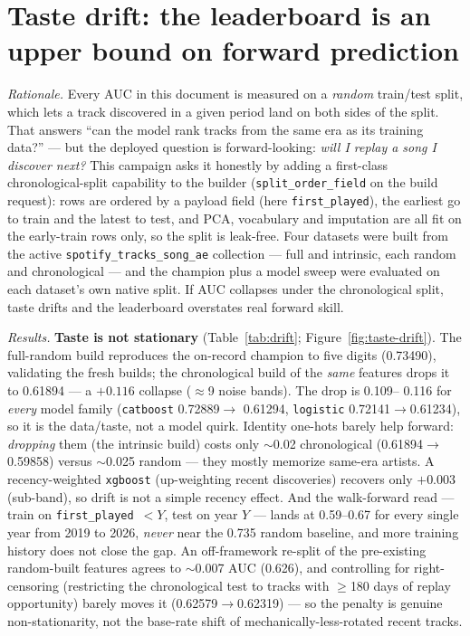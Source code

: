 \documentclass[11pt]{article}
\begin{document}
\section{Taste drift: the leaderboard is an upper bound on forward prediction}
\label{sec:drift}
\emph{Rationale.} Every AUC in this document is measured on a \emph{random}
train/test split, which lets a track discovered in a given period land on both
sides of the split. That answers ``can the model rank tracks from the same era
as its training data?'' --- but the deployed question is forward-looking:
\emph{will I replay a song I discover next?} This campaign asks it honestly by
adding a first-class chronological-split capability to the builder
(\texttt{split\_order\_field} on the build request): rows are ordered by a
payload field (here \texttt{first\_played}), the earliest go to train and the
latest to test, and PCA, vocabulary and imputation are all fit on the
early-train rows only, so the split is leak-free. Four datasets were built from
the active \texttt{spotify\_tracks\_song\_ae} collection --- full and intrinsic,
each random and chronological --- and the champion plus a model sweep were
evaluated on each dataset's own native split. If AUC collapses under the
chronological split, taste drifts and the leaderboard overstates real forward
skill.

\emph{Results.} \textbf{Taste is not stationary} (Table~\ref{tab:drift};
Figure~\ref{fig:taste-drift}). The full-random build reproduces the on-record
champion to five digits (\num{0.73490}), validating the fresh builds; the
chronological build of the \emph{same} features drops it to \num{0.61894} --- a
$+\num{0.116}$ collapse ($\approx$9 noise bands). The drop is \num{0.109}--%
\num{0.116} for \emph{every} model family (\texttt{catboost} \num{0.72889}$\to$%
\num{0.61294}, \texttt{logistic} \num{0.72141}$\to$\num{0.61234}), so it is the
data/taste, not a model quirk. Identity one-hots barely help forward:
\emph{dropping} them (the intrinsic build) costs only $\sim$0.02 chronological
(\num{0.61894}$\to$\num{0.59858}) versus $\sim$0.025 random --- they mostly
memorize same-era artists. A recency-weighted \texttt{xgboost} (up-weighting
recent discoveries) recovers only $+\num{0.003}$ (sub-band), so drift is not a
simple recency effect. And the walk-forward read --- train on
\texttt{first\_played}~$<Y$, test on year $Y$ --- lands at \num{0.59}--\num{0.67}
for every single year from 2019 to 2026, \emph{never} near the \num{0.735}
random baseline, and more training history does not close the gap. An
off-framework re-split of the pre-existing random-built features agrees to
$\sim$0.007 AUC (\num{0.626}), and controlling for right-censoring (restricting
the chronological test to tracks with $\ge$180 days of replay opportunity)
barely moves it (\num{0.62579}$\to$\num{0.62319}) --- so the penalty is genuine
non-stationarity, not the base-rate shift of mechanically-less-rotated recent
tracks.
\end{document}
